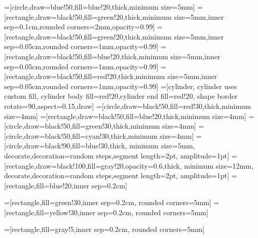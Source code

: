 \documentclass[a4paper,10pt]{article}
\begin{document}
=[circle,draw=blue!50,fill=blue!20,thick,minimum
   size=5mm]
=[rectangle,draw=black!50,fill=green!20,thick,minimum
   size=5mm,inner sep=0.1cm,rounded corners=2mm,opacity=0.99]
=[rectangle,draw=black!50,fill=green!20,thick,minimum
   size=5mm,inner sep=0.05cm,rounded corners=1mm,opacity=0.99]
=[rectangle,draw=black!50,fill=blue!20,thick,minimum
   size=5mm,inner sep=0.05cm,rounded corners=1mm,opacity=0.99]
=[rectangle,draw=black!50,fill=red!20,thick,minimum
   size=5mm,inner sep=0.05cm,rounded corners=1mm,opacity=0.99]
=[cylinder, cylinder uses custom fill,
   cylinder body fill=red!20,cylinder end fill=red!20,
   shape border rotate=90,aspect=0.15,draw] 
=[circle,draw=black!50,fill=red!30,thick,minimum
   size=4mm]
=[rectangle,draw=black!50,fill=blue!20,thick,minimum
   size=4mm]
=[circle,draw=black!50,fill=green!30,thick,minimum
   size=4mm]
=[circle,draw=black!50,fill=cyan!30,thick,minimum
   size=4mm]
=[circle,draw=black!90,fill=blue!30,thick,
  minimum size=5mm,
  decorate,decoration={random steps,segment length=2pt,
                                 amplitude=1pt}]
=[rectangle,draw=black!100,fill=gray!20,opacity=0.6,thick,
  minimum size=12mm,
  decorate,decoration={random steps,segment length=2pt,
                                 amplitude=1pt}]
=[rectangle,fill=blue!20,inner sep=0.2cm]


=[rectangle,fill=green!30,inner sep=0.2cm,
                                                rounded corners=5mm]
=[rectangle,fill=yellow!30,inner sep=0.2cm,
                                                rounded corners=5mm]

=[rectangle,fill=gray!5,inner sep=0.2cm,
                                                rounded corners=5mm]
\end{document}
